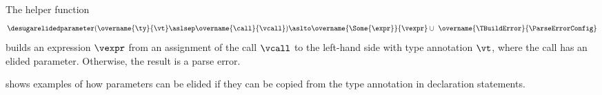 \begin{mathpar}
\end{mathpar}

\begin{mathpar}
\end{mathpar}

\hypertarget{def-desugarelidedparameter}{}
The helper function
\[
\desugarelidedparameter(
  \overname{\ty}{\vt} \aslsep
  \overname{\call}{\vcall})
\aslto
\overname{\Some{\expr}}{\vexpr}
\cup\ \overname{\TBuildError}{\ParseErrorConfig}
\]
builds an expression $\vexpr$ from an assignment of the call $\vcall$ to the left-hand side with type annotation $\vt$, where the call has an elided parameter.
Otherwise, the result is a parse error.

 shows examples of how parameters can be elided
if they can be copied from the type annotation in declaration statements.

\begin{mathpar}
\end{mathpar}

